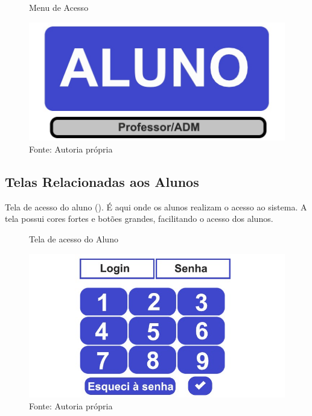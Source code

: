 \documentclass{utfpr-pg}
\begin{document}
        \begin{figure}[H]
            \centering
            \captionsetup{width=0.9\textwidth}
            \caption{Menu de Acesso}
            \includegraphics[width=\linewidth]{fotos/1.jpg}
            \caption*{Fonte: Autoria própria}
            \label{fig:1}
        \end{figure}
        
    \subsection{Telas Relacionadas aos Alunos}
       
        
        Tela de acesso do aluno (). É aqui onde os alunos realizam o acesso ao sistema. A tela possui cores fortes e botões grandes, facilitando o acesso dos alunos.
       
        \begin{figure}[H]
            \centering
            \captionsetup{width=0.9\textwidth}
            \caption{Tela de acesso do Aluno}
            \includegraphics[width=\linewidth]{fotos/2.jpg}
            \caption*{Fonte: Autoria própria}
            \label{fig:2}
        \end{figure}
\end{document}
